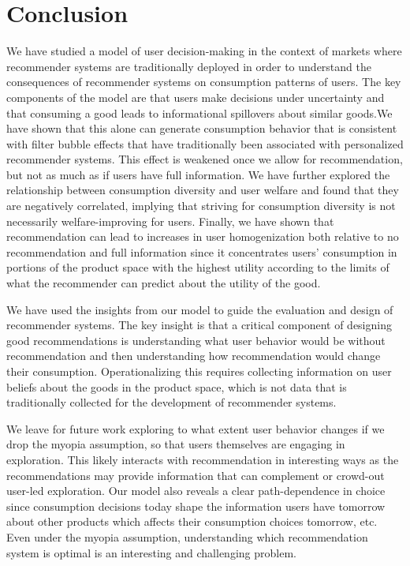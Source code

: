 \documentclass[sigconf, anonymous, review]{acmart}
\begin{document}
\section{Conclusion}
We have studied a model of user decision-making in the context of markets where recommender systems are traditionally deployed in order to understand the consequences of recommender systems on consumption patterns of users. The key components of the model are that users make decisions under uncertainty and that consuming a good leads to informational spillovers about similar goods.We have shown that this alone can generate consumption behavior that is consistent with filter bubble effects that have traditionally been associated with personalized recommender systems. This effect is weakened once we allow for recommendation, but not as much as if users have full information. We have further explored the relationship between consumption diversity and user welfare and found that they are negatively correlated, implying that striving for consumption diversity is not necessarily welfare-improving for users. Finally, we have shown that recommendation can lead to increases in user homogenization both relative to no recommendation and full information since it concentrates users' consumption in portions of the product space with the highest utility according to the limits of what the recommender can predict about the utility of the good.
\par

We have used the insights from our model to guide the evaluation and design of recommender systems. The key insight is that a critical component of designing good recommendations is understanding what user behavior would be without recommendation and then understanding how recommendation would change their consumption. Operationalizing this requires collecting information on user beliefs about the goods in the product space, which is not data that is traditionally collected for the development of recommender systems.
\par

We leave for future work exploring to what extent user behavior changes if we drop the myopia assumption, so that users themselves are engaging in exploration. This likely interacts with recommendation in interesting ways as the recommendations may provide information that can complement or crowd-out user-led exploration. Our model also reveals a clear path-dependence in choice since consumption decisions today shape the information users have tomorrow about other products which affects their consumption choices tomorrow, etc. Even under the myopia assumption, understanding which recommendation system is optimal is an interesting and challenging problem.
\par
\end{document}
